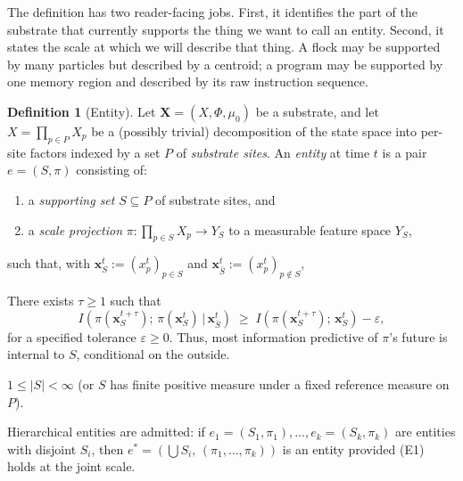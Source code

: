 \documentclass[journal]{IEEEtran}
\theoremstyle{plain}
\theoremstyle{definition}
\newtheorem{definition}[theorem]{Definition}
\theoremstyle{plain}
\newcommand{\X}{\mathbf{X}}
\begin{document}
The definition has two reader-facing jobs. First, it identifies the part of the
substrate that currently supports the thing we want to call an entity. Second,
it states the scale at which we will describe that thing. A flock may be
supported by many particles but described by a centroid; a program may be
supported by one memory region and described by its raw instruction sequence.

\begin{definition}[Entity]\label{def:entity}
Let $\X=(X,\Phi,\mu_0)$ be a substrate, and let $X = \prod_{p\in P} X_p$ be a
(possibly trivial) decomposition of the state space into per-site factors
indexed by a set $P$ of \emph{substrate sites}. An \emph{entity} at time $t$
is a pair $e = (S, \pi)$ consisting of:
\begin{enumerate}[leftmargin=2em,itemsep=2pt]
  \item a \emph{supporting set} $S \subseteq P$ of substrate sites, and
  \item a \emph{scale projection}
        $\pi : \prod_{p\in S} X_p \to Y_S$
        to a measurable feature space $Y_S$,
\end{enumerate}
such that, with $\mathbf{x}_S^t := (x_p^t)_{p\in S}$ and
$\mathbf{x}_{\bar S}^t := (x_p^t)_{p\notin S}$,

\begin{description}[leftmargin=2em,itemsep=4pt]
  \item[(E1) Persistence (information closure).]
  There exists $\tau \geq 1$ such that
  \[
    I\!\left(\pi(\mathbf{x}_S^{t+\tau});\, \pi(\mathbf{x}_S^{t}) \,\big|\, \mathbf{x}_{\bar S}^{t}\right)
    \;\geq\;
    I\!\left(\pi(\mathbf{x}_S^{t+\tau});\, \mathbf{x}_S^{t}\right) - \varepsilon,
  \]
  for a specified tolerance $\varepsilon \geq 0$. Thus, most information
  predictive of $\pi$'s future is internal to $S$, conditional on the outside.

  \item[(E2) Boundedness.]
  $1 \leq |S|<\infty$ (or $S$ has finite positive measure under a fixed
  reference measure on $P$).

  \item[(E3) Compositionality.]
  Hierarchical entities are admitted: if
  $e_1=(S_1,\pi_1),\dots,e_k=(S_k,\pi_k)$ are entities with disjoint $S_i$,
  then $e^* = (\bigcup S_i,\, (\pi_1,\dots,\pi_k))$ is an entity provided
  (E1) holds at the joint scale.
\end{description}
\end{definition}
\end{document}
